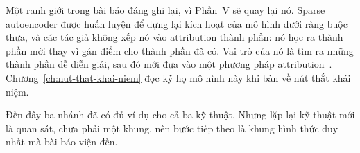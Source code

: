 Một ranh giới trong bài báo đáng ghi lại, vì Phần~V sẽ quay lại nó. Sparse
autoencoder được huấn luyện để dựng lại kích hoạt của mô hình dưới ràng buộc
thưa, và các tác giả không xếp nó vào attribution thành phần: nó học ra thành
phần mới thay vì gán điểm cho thành phần đã có. Vai trò của nó là tìm ra những
thành phần dễ diễn giải, sau đó mới đưa vào một phương pháp
attribution~\autocite{p18unified}. Chương~\ref{ch:nut-that-khai-niem} đọc kỹ họ
mô hình này khi bàn về nút thắt khái niệm.

Đến đây ba nhánh đã có đủ ví dụ cho cả ba kỹ thuật. Nhưng lặp lại kỹ thuật mới
là quan sát, chưa phải một khung, nên bước tiếp theo là khung hình thức duy nhất
mà bài báo viện đến.
